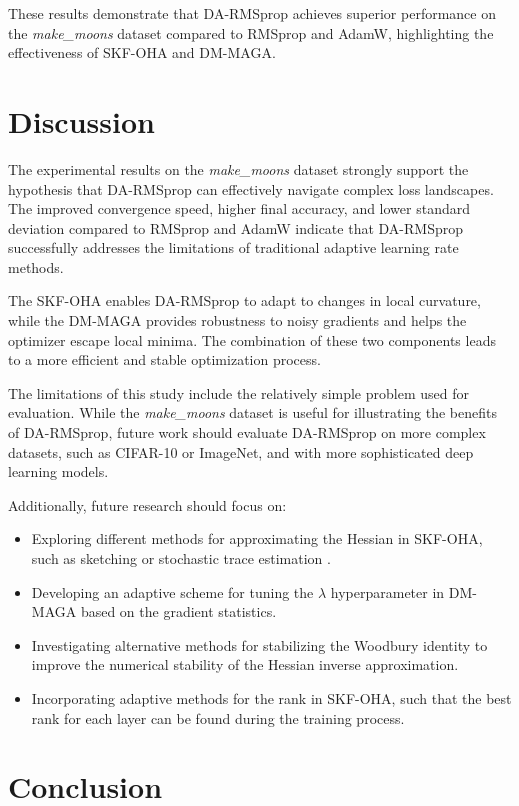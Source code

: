 \documentclass[a4paper,11pt]{article}
\begin{document}
These results demonstrate that DA-RMSprop achieves superior performance on the \textit{make\_moons} dataset compared to RMSprop and AdamW, highlighting the effectiveness of SKF-OHA and DM-MAGA.

\section{Discussion}

The experimental results on the \textit{make\_moons} dataset strongly support the hypothesis that DA-RMSprop can effectively navigate complex loss landscapes. The improved convergence speed, higher final accuracy, and lower standard deviation compared to RMSprop and AdamW indicate that DA-RMSprop successfully addresses the limitations of traditional adaptive learning rate methods.

The SKF-OHA enables DA-RMSprop to adapt to changes in local curvature, while the DM-MAGA provides robustness to noisy gradients and helps the optimizer escape local minima. The combination of these two components leads to a more efficient and stable optimization process.

The limitations of this study include the relatively simple problem used for evaluation. While the \textit{make\_moons} dataset is useful for illustrating the benefits of DA-RMSprop, future work should evaluate DA-RMSprop on more complex datasets, such as CIFAR-10 or ImageNet, and with more sophisticated deep learning models.

Additionally, future research should focus on:

\begin{itemize}
    \item Exploring different methods for approximating the Hessian in SKF-OHA, such as sketching or stochastic trace estimation \citep{byrd2011use}.
    \item Developing an adaptive scheme for tuning the \(\lambda\) hyperparameter in DM-MAGA based on the gradient statistics.
    \item Investigating alternative methods for stabilizing the Woodbury identity to improve the numerical stability of the Hessian inverse approximation.
    \item Incorporating adaptive methods for the rank in SKF-OHA, such that the best rank for each layer can be found during the training process.
\end{itemize}

\section{Conclusion}
\end{document}
